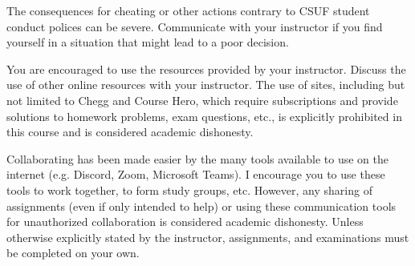 \documentclass{syllabus}
\begin{document}
The consequences for cheating or other actions contrary to CSUF student
conduct polices can be severe. Communicate with your instructor if you find
yourself in a situation that might lead to a poor decision.

You are encouraged to use the resources provided by your instructor. Discuss
the use of other online resources with your instructor. The use of sites,
including but not limited to Chegg and Course Hero, which require
subscriptions and provide solutions to homework problems, exam questions,
etc., is explicitly prohibited in this course and is considered academic
dishonesty.

Collaborating has been made easier by the many tools available to use on the
internet (e.g. Discord, Zoom, Microsoft Teams). I encourage you to use these
tools to work together, to form study groups, etc. However, any sharing
of assignments (even if only intended to help) or using
these communication tools for unauthorized collaboration is considered
academic dishonesty. Unless otherwise explicitly stated by the instructor,
assignments, and examinations must be completed on your own.
\end{document}
